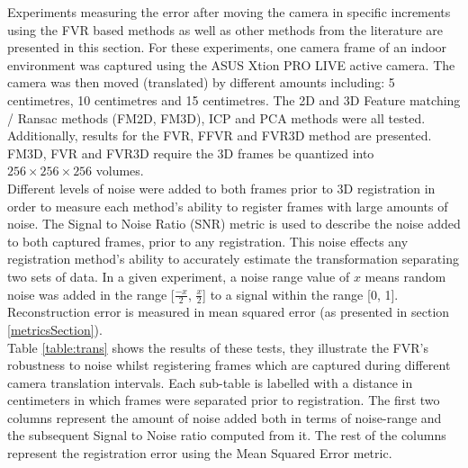 
Experiments measuring the error after moving the camera in specific increments using the FVR based methods as well as other methods from the literature are presented in this section. For these experiments, one camera frame of an indoor environment was captured using the ASUS Xtion PRO LIVE active camera. The camera was then moved (translated) by different amounts including: 5 centimetres, 10 centimetres and 15 centimetres. The 2D and 3D Feature matching / Ransac methods (FM2D, FM3D), ICP and PCA methods were all tested. Additionally, results for the FVR, FFVR and FVR3D method are presented. FM3D, FVR and FVR3D require the 3D frames be quantized into $256\times 256\times 256$ volumes. \\

Different levels of noise were added to both frames prior to 3D registration in order to measure each method's ability to register frames with large amounts of noise. The Signal to Noise Ratio (SNR) metric is used to describe the noise added to both captured frames, prior to any registration. This noise effects any registration method's ability to accurately estimate the transformation separating two sets of data. In a given experiment, a noise range value of $x$ means random noise was added in the range [$\frac{-x}{2}$, $\frac{x}{2}$] to a signal within the range [0, 1]. Reconstruction error is measured in mean squared error (as presented in section \ref{metricsSection}). \\

Table \ref{table:trans} shows the results of these tests, they illustrate the FVR's robustness to noise whilst registering frames which are captured during different camera translation intervals. Each sub-table is labelled with a distance in centimeters in which frames were separated prior to registration. The first two columns represent the amount of noise added both in terms of noise-range and the subsequent Signal to Noise ratio computed from it. The rest of the columns represent the registration error using the Mean Squared Error metric.  \\

